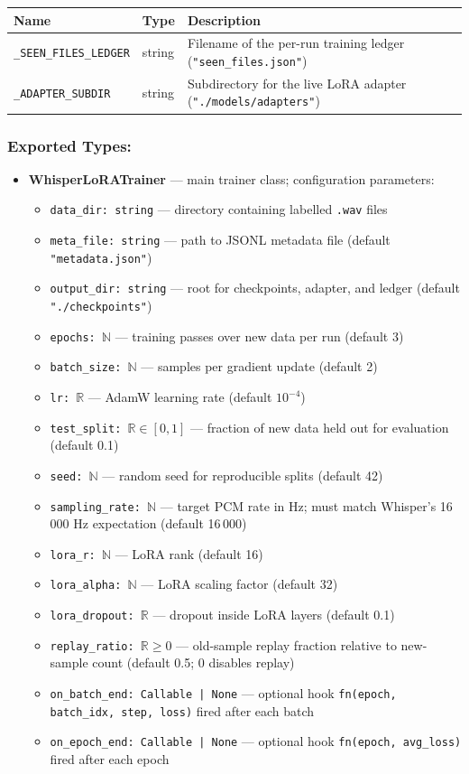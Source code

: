 \documentclass[12pt, titlepage]{article}
\begin{document}
\begin{tabular}{|l|l|l|}
\hline
\textbf{Name} & \textbf{Type} & \textbf{Description} \\ \hline
\texttt{\_SEEN\_FILES\_LEDGER} & string & Filename of the per-run training ledger (\texttt{"seen\_files.json"}) \\ \hline
\texttt{\_ADAPTER\_SUBDIR}     & string & Subdirectory for the live LoRA adapter (\texttt{"./models/adapters"}) \\ \hline
\end{tabular}

\subsubsection{Exported Types:}

\begin{itemize}
  \item \textbf{WhisperLoRATrainer} — main trainer class; configuration parameters:
  \begin{itemize}
    \item \texttt{data\_dir: string} — directory containing labelled \texttt{.wav} files
    \item \texttt{meta\_file: string} — path to JSONL metadata file (default \texttt{"metadata.json"})
    \item \texttt{output\_dir: string} — root for checkpoints, adapter, and ledger (default \texttt{"./checkpoints"})
    \item \texttt{epochs: $\mathbb{N}$} — training passes over new data per run (default 3)
    \item \texttt{batch\_size: $\mathbb{N}$} — samples per gradient update (default 2)
    \item \texttt{lr: $\mathbb{R}$} — AdamW learning rate (default $10^{-4}$)
    \item \texttt{test\_split: $\mathbb{R} \in [0,1]$} — fraction of new data held out for evaluation (default 0.1)
    \item \texttt{seed: $\mathbb{N}$} — random seed for reproducible splits (default 42)
    \item \texttt{sampling\_rate: $\mathbb{N}$} — target PCM rate in Hz; must match Whisper's 16\,000 Hz expectation (default 16\,000)
    \item \texttt{lora\_r: $\mathbb{N}$} — LoRA rank (default 16)
    \item \texttt{lora\_alpha: $\mathbb{N}$} — LoRA scaling factor (default 32)
    \item \texttt{lora\_dropout: $\mathbb{R}$} — dropout inside LoRA layers (default 0.1)
    \item \texttt{replay\_ratio: $\mathbb{R} \geq 0$} — old-sample replay fraction relative to new-sample count (default 0.5; 0 disables replay)
    \item \texttt{on\_batch\_end: Callable | None} — optional hook \texttt{fn(epoch, batch\_idx, step, loss)} fired after each batch
    \item \texttt{on\_epoch\_end: Callable | None} — optional hook \texttt{fn(epoch, avg\_loss)} fired after each epoch
  \end{itemize}
\end{itemize}
\end{document}
